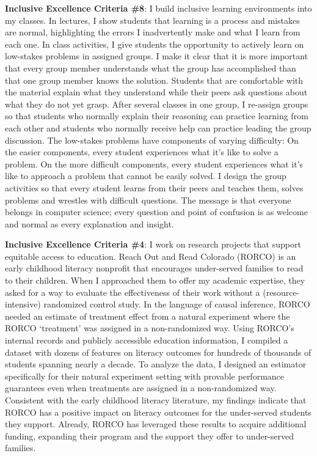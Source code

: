 \documentclass[11pt]{article}
\begin{document}
{\textbf{Inclusive Excellence Criteria \#8}:
I build inclusive learning environments into my classes. In lectures, I show students that learning is a process and mistakes are normal, highlighting the errors I inadvertently make and what I learn from each one. In class activities, I give students the opportunity to actively learn on low-stakes problems in assigned groups. I make it clear that it is more important that every group member understands what the group has accomplished than that one group member knows the solution. Students that are comfortable with the material explain what they understand while their peers ask questions about what they do not yet grasp. After several classes in one group, I re-assign groups so that students who normally explain their reasoning can practice learning from each other and students who normally receive help can practice leading the group discussion. The low-stakes problems have components of varying difficulty: On the easier components, every student experiences what it's like to solve a problem. On the more difficult components, every student experiences what it's like to approach a problem that cannot be easily solved. I design the group activities so that every student learns from their peers and teaches them, solves problems and wrestles with difficult questions. The message is that everyone belongs in computer science; every question and point of confusion is as welcome and normal as every explanation and insight.

\textbf{Inclusive Excellence Criteria \#4}:
I work on research projects that support equitable access to education. Reach Out and Read Colorado (RORCO) is an early childhood literacy nonprofit that encourages under-served families to read to their children. When I approached them to offer my academic expertise, they asked for a way to evaluate the effectiveness of their work without a (resource-intensive) randomized control study. In the language of causal inference, RORCO needed an estimate of treatment effect from a natural experiment where the RORCO `treatment' was assigned in a non-randomized way. Using RORCO's internal records and publicly accessible education information, I compiled a dataset with dozens of features on literacy outcomes for hundreds of thousands of students spanning nearly a decade. To analyze the data, I designed an estimator specifically for their natural experiment setting with provable performance guarantees even when treatments are assigned in a non-randomized way. Consistent with the early childhood literacy literature, my findings indicate that RORCO has a positive impact on literacy outcomes for the under-served students they support. Already, RORCO has leveraged these results to acquire additional funding, expanding their program and the support they offer to under-served families.

}
\end{document}
